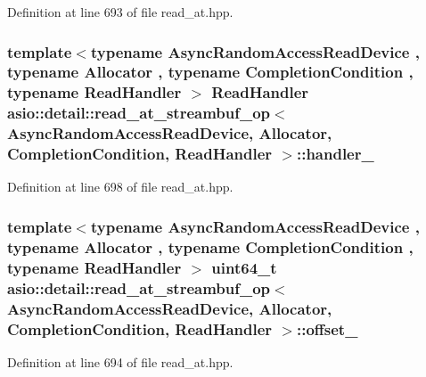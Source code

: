 Definition at line 693 of file read\+\_\+at.\+hpp.

\hypertarget{classasio_1_1detail_1_1read__at__streambuf__op_a73f01af5d9e981536d75e4dac0798a04}{}
\subsubsection[{handler\+\_\+}]{\setlength{\rightskip}{0pt plus 5cm}template$<$typename Async\+Random\+Access\+Read\+Device , typename Allocator , typename Completion\+Condition , typename Read\+Handler $>$ Read\+Handler {\bf asio\+::detail\+::read\+\_\+at\+\_\+streambuf\+\_\+op}$<$ Async\+Random\+Access\+Read\+Device, Allocator, Completion\+Condition, Read\+Handler $>$\+::handler\+\_\+}\label{classasio_1_1detail_1_1read__at__streambuf__op_a73f01af5d9e981536d75e4dac0798a04}


Definition at line 698 of file read\+\_\+at.\+hpp.

\hypertarget{classasio_1_1detail_1_1read__at__streambuf__op_a4fab4da83a7cf41f75968f9df4510189}{}
\subsubsection[{offset\+\_\+}]{\setlength{\rightskip}{0pt plus 5cm}template$<$typename Async\+Random\+Access\+Read\+Device , typename Allocator , typename Completion\+Condition , typename Read\+Handler $>$ uint64\+\_\+t {\bf asio\+::detail\+::read\+\_\+at\+\_\+streambuf\+\_\+op}$<$ Async\+Random\+Access\+Read\+Device, Allocator, Completion\+Condition, Read\+Handler $>$\+::offset\+\_\+}\label{classasio_1_1detail_1_1read__at__streambuf__op_a4fab4da83a7cf41f75968f9df4510189}


Definition at line 694 of file read\+\_\+at.\+hpp.

\hypertarget{classasio_1_1detail_1_1read__at__streambuf__op_aff5cf4e15b32e09e234e86edc88d2a91}{}
